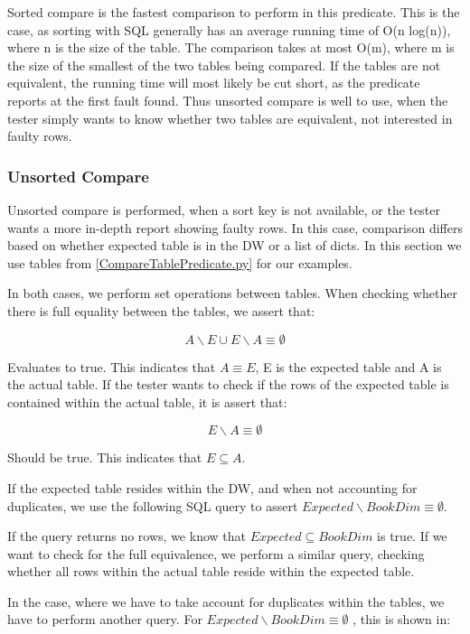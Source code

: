 Sorted compare is the  fastest comparison to perform in this predicate. This is the case, as sorting with SQL generally has an average running time of O(n log(n)), where n is the size of the table. The comparison takes at most O(m), where m is the size of the smallest of the two tables being compared. If the tables are not equivalent, the running time will most likely be cut short, as the predicate reports at the first fault found. Thus unsorted compare is well to use, when the tester simply wants to know whether two tables are equivalent, not interested in faulty rows.



\subsubsection{Unsorted Compare}
Unsorted compare is performed, when a sort key is not available, or the tester wants a more in-depth report showing faulty rows. In this case, comparison differs based on whether expected table is in the DW or a list of dicts. In this section we use tables from \cref{CompareTablePredicate.py} for our examples.

In both cases, we perform set operations between tables. When checking whether there is full equality between the tables, we assert that:

\[ A \backslash E \cup E \backslash A \equiv \emptyset \]

Evaluates to true. This indicates that  $A \equiv E$, E is the expected table and A is the actual table. If the tester wants to check if the rows of the expected table is contained within the actual table, it is assert that:
 
\[ E \backslash A \equiv \emptyset \]

Should be true. This indicates that $E \subseteq A$. 

If the expected table resides within the DW, and when not accounting for duplicates, we use the following SQL query to assert $Expected \backslash BookDim \equiv \emptyset $.


If the query returns no rows, we know that $Expected \subseteq BookDim$ is true. If we want to check for the full equivalence, we perform a similar query, checking whether all rows within the actual table reside within  the expected table.

In the case, where we have to take account for duplicates within the tables, we have to perform another query. For $Expected \backslash BookDim \equiv \emptyset$ , this is shown in:

